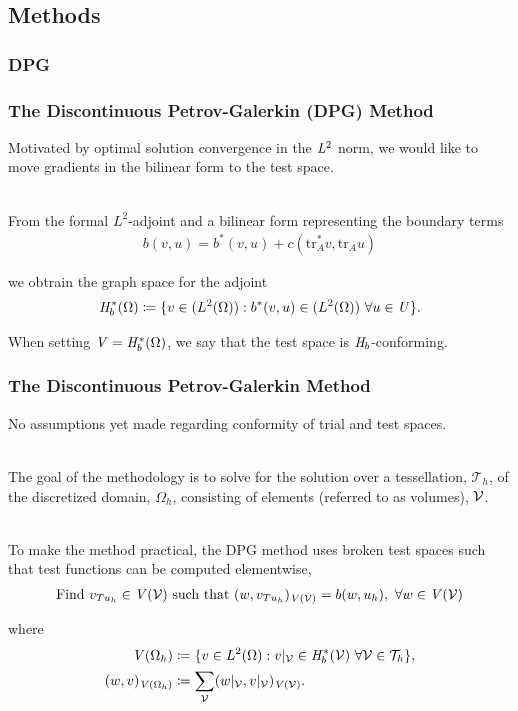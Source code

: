 \subsection{Methods}

\subsubsection{DPG}

\begin{frame}
\frametitle{The Discontinuous Petrov-Galerkin (DPG) Method}

Motivated by optimal solution convergence in the $\mathit{{{L}}}^2$ norm, we would like
to move gradients in the bilinear form to the test space.
\\~

From the formal $L^2$-adjoint and a bilinear form representing the boundary terms
\begin{align}
b(v,u) = b^*(v,u) + c(\text{tr}_A^* v, \text{tr}_A u)
\end{align}

we obtrain the graph space for the adjoint
\begin{align}
\mathit{{{H}}}_b^*(\Omega) \coloneqq
\{ v \in (L^2(\Omega)) : b^*(v,u) \in (L^2(\Omega))\ \forall u \in \mathit{{{U}}} \}.
\end{align}

When setting $\mathit{{{V}}} = \mathit{{{H}}}_b^*(\Omega)$, we say that the test space is $\mathit{{{H}}}_b$-conforming.

\end{frame}

\begin{frame}
\frametitle{The Discontinuous Petrov-Galerkin Method}

No assumptions yet made regarding conformity of trial and test spaces.
\\~

The goal of the methodology is to solve for the solution over a tessellation,
$\mathcal{T}_h$, of the discretized domain, $\Omega_h$, consisting of elements (referred to as volumes), $\mathcal{{{V}}}$.
\\~

To make the method practical, the DPG method uses broken test spaces such that
test functions can be computed elementwise,
\begin{align} \label{eq:auxiliary_opt_v_infinite}
\text{Find}\ v_{T u_h} \in \mathit{{{V}}}(\mathcal{{{V}}})\ \text{such that}\
(w,v_{T u_h})_{\mathit{{{V}}}(\mathcal{{{V}}})} = b(w,u_h),\ \forall w \in \mathit{{{V}}}(\mathcal{{{V}}})
\end{align}

where
\begin{align}
\mathit{{{V}}}(\Omega_h)
&\coloneqq
\{ v \in L^2(\Omega) : v|_{\mathcal{{{V}}}} \in \mathit{{{H}}}_b^*(\mathcal{{{V}}})\ \forall \mathcal{{{V}}} \in \mathcal{T}_h \}, \\
(w,v)_{\mathit{{{V}}}(\Omega_h)}
&\coloneqq
\sum_{\mathcal{{{V}}}} (w|_{\mathcal{{{V}}}},v|_{\mathcal{{{V}}}})_{\mathit{{{V}}}(\mathcal{{{V}}})}.
\end{align}

\end{frame}

